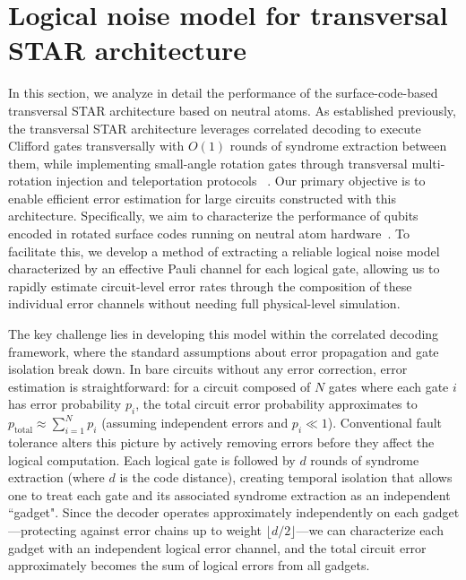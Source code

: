 \documentclass[aps, prx, reprint, superscriptaddress, longbibliography, floatfix]{revtex4-2}
\begin{document}
\section{Logical noise model for transversal STAR architecture}\label{sec:logicalnoise}

In this section, we analyze in detail the performance of the surface-code-based transversal STAR architecture based on neutral atoms. As established previously, the transversal STAR architecture leverages correlated decoding to execute Clifford gates transversally with $O(1)$ rounds of syndrome extraction between them, while implementing small-angle rotation gates through transversal multi-rotation  injection and teleportation protocols ~\cite{Choi2023, Akahoshi2024}. Our primary objective is to enable efficient error estimation for large circuits constructed with this architecture. Specifically, we aim to characterize the performance of qubits encoded in rotated surface codes running on neutral atom hardware~\cite{Bluvstein2022, Bluvstein2024, Rodriguez2024}. To facilitate this, we develop a method of extracting a reliable logical noise model characterized by an effective Pauli channel for each logical gate, allowing us to rapidly estimate circuit-level error rates through the composition of these individual error channels without needing full physical-level simulation.

The key challenge lies in developing this model within the correlated decoding framework, where the standard assumptions about error propagation and gate isolation break down. In bare circuits without any error correction, error estimation is straightforward: for a circuit composed of $N$ gates where each gate $i$ has error probability $p_i$, the total circuit error probability approximates to $p_{\text{total}} \approx \sum_{i=1}^{N} p_i$ (assuming independent errors and $p_i \ll 1$). Conventional fault tolerance alters this picture by actively removing errors before they affect the logical computation. Each logical gate is followed by $d$ rounds of syndrome extraction (where $d$ is the code distance), creating temporal isolation that allows one to treat each gate and its associated syndrome extraction as an independent ``gadget". Since the decoder operates approximately independently on each gadget—protecting against error chains up to weight $\lfloor d/2 \rfloor$—we can characterize each gadget with an independent logical error channel, and the total circuit error approximately becomes the sum of logical errors from all gadgets.
\end{document}
